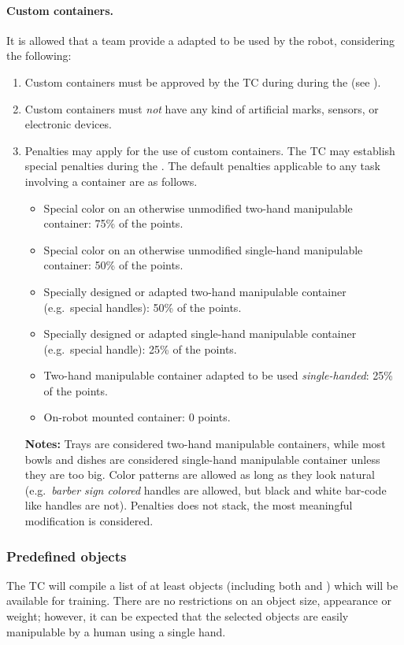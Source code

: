 \paragraph*{Custom containers.}
\label{rule:custom_containers}
It is allowed that a team provide a  adapted to be used by the robot, considering the following:
\begin{enumerate}
	\item Custom containers must be approved by the TC during during the  (see ).
	\item Custom containers must \emph{not} have any kind of artificial marks, sensors, or electronic devices.
	\item Penalties may apply for the use of custom containers. The TC may establish special penalties during the . The default penalties applicable to any task involving a container are as follows.
	\begin{itemize}
		\item Special color on an otherwise unmodified two-hand manipulable container: 75\% of the points.
		\item Special color on an otherwise unmodified single-hand manipulable container: 50\% of the points.
		\item Specially designed or adapted two-hand manipulable container (e.g.~special handles): 50\% of the points.
		\item Specially designed or adapted single-hand manipulable container (e.g.~special handle): 25\% of the points.
		\item Two-hand manipulable container adapted to be used \textit{single-handed}: 25\% of the points.
		\item On-robot mounted container: 0 points.
	\end{itemize}
	\textbf{Notes:} Trays are considered two-hand manipulable containers, while most bowls and dishes are considered single-hand manipulable container unless they are too big. Color patterns are allowed as long as they look natural (e.g.~\textit{barber sign colored} handles are allowed, but black and white bar-code like handles are not). Penalties does not stack, the most meaningful modification is considered. 
\end{enumerate}

\subsubsection{Predefined objects}
The TC will compile a list of at least \NumObjects objects (including both  and ) which will be available for training. There are no restrictions on an object size, appearance or weight; however, it can be expected that the selected objects are easily manipulable by a human using a single hand.

